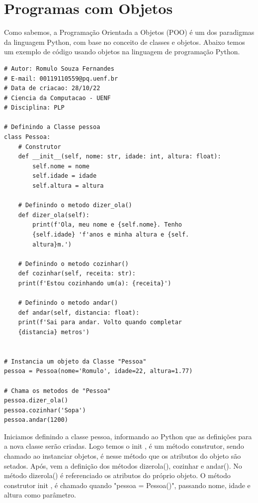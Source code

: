     \section{Programas com Objetos}
    Como sabemos, a Programação Orientada a Objetos (POO) é um dos paradigmas da linguagem
    Python, com base no conceito de classes e objetos. Abaixo temos um exemplo de código usando objetos na linguagem de programação Python.
\begin{lstlisting}
# Autor: Romulo Souza Fernandes
# E-mail: 00119110559@pq.uenf.br
# Data de criacao: 28/10/22
# Ciencia da Computacao - UENF
# Disciplina: PLP

# Definindo a Classe pessoa
class Pessoa:
	# Construtor
	def __init__(self, nome: str, idade: int, altura: float):
		self.nome = nome
		self.idade = idade
		self.altura = altura

	# Definindo o metodo dizer_ola()
	def dizer_ola(self):
		print(f'Ola, meu nome e {self.nome}. Tenho 
		{self.idade} 'f'anos e minha altura e {self.
		altura}m.')

	# Definindo o metodo cozinhar()
	def cozinhar(self, receita: str):
	print(f'Estou cozinhando um(a): {receita}')

	# Definindo o metodo andar()
	def andar(self, distancia: float):
	print(f'Sai para andar. Volto quando completar 
	{distancia} metros')


# Instancia um objeto da Classe "Pessoa"
pessoa = Pessoa(nome='Romulo', idade=22, altura=1.77)

# Chama os metodos de "Pessoa"
pessoa.dizer_ola()
pessoa.cozinhar('Sopa')
pessoa.andar(1200)
\end{lstlisting}
	Iniciamos definindo a classe pessoa, informando ao Python que as definições para a nova classe serão criadas. Logo temos o \textunderscore\textunderscore init \textunderscore\textunderscore, é um método construtor, sendo chamado ao instanciar objetos, é nesse método que os atributos do objeto são setados. Após, vem a definição dos métodos dizer\textunderscore ola(), cozinhar e andar(). No método dizer\textunderscore ola() é referenciado os atributos do próprio objeto. O método construtor \textunderscore\textunderscore init \textunderscore\textunderscore, é chamado quando "pessoa = Pessoa()", passando nome, idade e altura como parâmetro.
	
